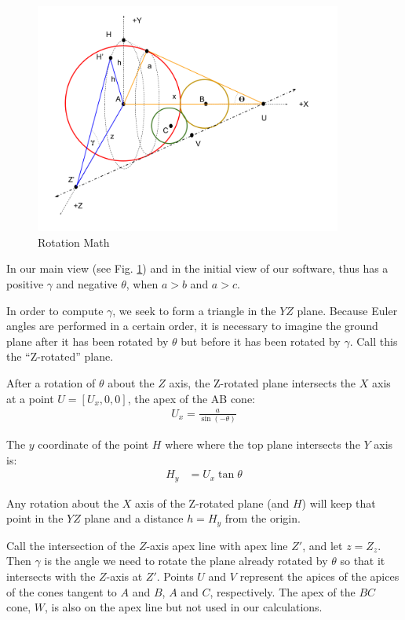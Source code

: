 \documentclass{article}
\begin{document}
\begin{figure}
     \centering
     \includegraphics[width=0.9\textwidth]{figures/RotationMathII.png}
     \caption{Rotation Math}
  \label{fig:rotation}
\end{figure}

In our main view (see Fig. \ref{fig:rotation}) and in the initial view
of our software, thus has a positive $\gamma$ and negative $\theta$, when $a > b$ and $a > c$.

In order to compute $\gamma$, we seek to form a triangle in the $YZ$ plane.
Because Euler angles are performed in a certain order, it is necessary to imagine
the ground plane after it has been rotated by $\theta$ but before it has been rotated by $\gamma$.
Call this the ``Z-rotated'' plane.



After a rotation of $\theta$ about the $Z$ axis, the Z-rotated plane intersects the $X$ axis
at a point $U = [U_x,0,0]$, the apex of the AB cone:
\begin{align}
  U_x = \frac{a}{\sin{(-\theta)}}
\end{align}

The $y$ coordinate of the point $H$ where where the top plane intersects
the $Y$ axis is:
\begin{align}
  H_y &= U_x \tan{\theta}
\end{align}

Any rotation about the $X$ axis of the Z-rotated plane (and $H$) will keep that
point in the $YZ$ plane and a distance $ h = H_y$ from the origin.

Call the intersection
of the $Z$-axis apex line with apex line $Z'$, and let $z = Z_z$.
Then $\gamma$ is the angle we need to rotate the plane already rotated by $\theta$ so that it intersects with the
$Z$-axis at $Z'$.
Points $U$ and $V$ represent the apices of the apices of the cones tangent to $A$ and $B$, $A$ and $C$, respectively.
The apex of the $BC$ cone, $W$, is also on the apex line but not used in our calculations.
\end{document}
